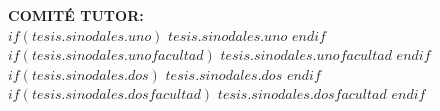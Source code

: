 \begin{titlepage}
\begin{center}
        {\small \textbf{COMITÉ TUTOR:}}\\
        {\small $if(tesis.sinodales.uno)$ $tesis.sinodales.uno$ $endif$}\\
        {\small $if(tesis.sinodales.unofacultad)$ $tesis.sinodales.unofacultad$ $endif$}\\[0.3cm]
        {\small $if(tesis.sinodales.dos)$ $tesis.sinodales.dos$ $endif$}\\
        {\small $if(tesis.sinodales.dosfacultad)$ $tesis.sinodales.dosfacultad$ $endif$}\\[1cm]
        
        
    \end{center}
\end{titlepage}


\newpage
\begin{center}
\end{center}

\newpage
\begin{center}
\end{center}

